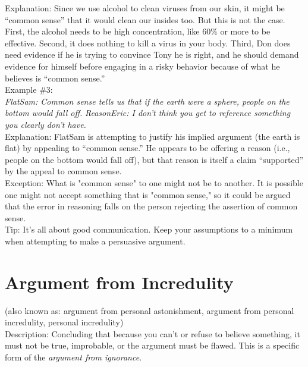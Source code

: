 \documentclass[a4paper,12pt,single,pdftex]{scrartcl}
\begin{document}
{    
      Explanation: Since we use alcohol to clean viruses from our skin, it might be “common sense” that it would clean our insides too. But this is not the case. First, the alcohol needs to be high concentration, like 60\% or more to be effective. Second, it does nothing to kill a virus in your body. Third, Don does need evidence if he is trying to convince Tony he is right, and he should demand evidence for himself before engaging in a risky behavior because of what he believes is “common sense.”
    \\

    
      Example \#3:
    \\

    
      {\em FlatSam: Common sense tells us that if the earth were a sphere, people on the bottom would fall off.} \newline
{\em ReasonEric: I don’t think you get to reference something you clearly don’t have.}
    \\

    
      Explanation: FlatSam is attempting to justify his implied argument (the earth is flat) by appealing to “common sense.” He appears to be offering a reason (i.e., people on the bottom would fall off), but that reason is itself a claim “supported” by the appeal to common sense.
    \\

    
      Exception: What is "common sense" to one might not be to another. It is possible one might not accept something that is "common sense," so it could be argued that the error in reasoning falls on the person rejecting the assertion of common sense.
    \\

    
      Tip: It's all about good communication. Keep your assumptions to a minimum when attempting to make a persuasive argument.
    \\

    
    

    \section{
      Argument from Incredulity
    }
  
    

    
      (also known as:  argument from personal astonishment, argument from personal incredulity, personal incredulity)
    \\

    
      Description: Concluding that because you can't or refuse to believe something, it must not be true, improbable, or the argument must be flawed. This is a specific form of the {\it argument from ignorance}.
    \\

}
\end{document}
